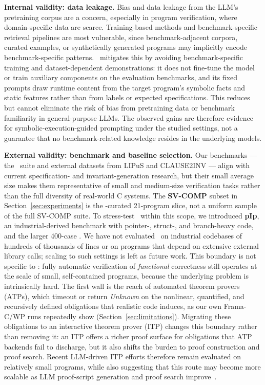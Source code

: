\DIFaddbegin
\smallskip
\noindent\textbf{Internal validity: data leakage.}
Bias and data leakage from the LLM's pretraining corpus are a concern,
especially in program verification, where domain-specific data are scarce.
Training-based methods and benchmark-specific retrieval pipelines are most
vulnerable, since benchmark-adjacent corpora, curated examples, or synthetically
generated programs may implicitly encode benchmark-specific patterns.
\toolname\ mitigates this by avoiding benchmark-specific training and
dataset-dependent demonstrations: it does not fine-tune the model or train
auxiliary components on the evaluation benchmarks, and its fixed prompts draw
runtime content from the target program's symbolic facts and static features
rather than from labels or expected specifications. This reduces but cannot
eliminate the risk of bias from pretraining data or benchmark familiarity in
general-purpose LLMs. The observed gains are therefore evidence for
symbolic-execution-guided prompting under the studied settings, not a guarantee
that no benchmark-related knowledge resides in the underlying models.
\DIFaddend

\DIFaddbegin
\smallskip
\noindent\textbf{External validity: benchmark and baseline selection.}
Our benchmarks --- the \autospec\ suite and external datasets from LIPuS and
CLAUSE2INV --- align with current specification- and invariant-generation
research, but their small average size makes them representative of small and
medium-size verification tasks rather than the full diversity of real-world C
systems. The \textbf{SV-COMP} subset in Section~\ref{sec:experiments} is the
\autospec-curated 21-program slice, not a uniform sample of the full SV-COMP
suite. To stress-test \toolname\ within this scope, we introduced \textbf{pIp},
an industrial-derived benchmark with pointer-, struct-, and branch-heavy code,
and the larger 400-case \textbf{}. We have not evaluated \toolname\ on
industrial codebases of hundreds of thousands of lines or on programs that
depend on extensive external library calls; scaling to such settings is left as
future work. This boundary is not specific to \toolname: fully automatic
verification of \emph{functional} correctness still operates at the scale of
small, self-contained programs, because the underlying problem is intrinsically
hard. The first wall is the reach of automated theorem provers (ATPs), which
timeout or return \emph{Unknown} on the nonlinear, quantified, and recursively
defined obligations that realistic code induces, as our own Frama-C/WP runs
repeatedly show (Section~\ref{sec:limitations}). Migrating these obligations to
an interactive theorem prover (ITP) changes this boundary rather than removing
it: an ITP offers a richer proof surface for obligations that ATP backends fail
to discharge, but it also shifts the burden to proof construction and proof
search. Recent LLM-driven ITP efforts therefore remain evaluated on relatively
small programs, while also suggesting that this route may become more scalable
as LLM proof-script generation and proof search improve~\cite{yang2026how,thakur2025clever,ye2026verina,li2026goedelcodeproverhierarchicalproofsearch}.
\DIFaddend

